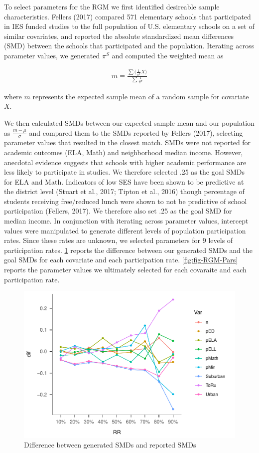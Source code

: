 \documentclass[man,floatsintext]{apa6}
\theoremstyle{definition}
\theoremstyle{definition}
\theoremstyle{definition}
\theoremstyle{remark}
\begin{document}
To select parameters for the RGM we first identified desireable sample
characteristics. Fellers (2017) compared 571 elementary schools that
participated in IES funded studies to the full population of U.S.
elementary schools on a set of similar covariates, and reported the
absolute standardized mean differences (SMD) between the schools that
participated and the population. Iterating across parameter values, we
generated \(\pi^S\) and computed the weighted mean as

\begin{align}
  m = \frac{\sum{(\frac{1}{\pi^S} X})}{\sum{\frac{1}{\pi^S}}}
\end{align}

where \(m\) represents the expected sample mean of a random sample for
covariate \(X\).

We then calculated SMDs between our expected sample mean and our
population as \(\frac{m - \mu}{\sigma}\) and compared them to the SMDs
reported by Fellers (2017), selecting parameter values that resulted in
the closest match. SMDs were not reported for academic outcomes (ELA,
Math) and neighborhood median income. However, anecdotal evidence
suggests that schools with higher academic performance are less likely
to participate in studies. We therefore selected .25 as the goal SMDs
for ELA and Math. Indicators of low SES have been shown to be predictive
at the district level (Stuart et al., 2017; Tipton et al., 2016) though
percentage of students receiving free/reduced lunch were shown to not be
predictive of school participation (Fellers, 2017). We therefore also
set .25 as the goal SMD for median income. In conjunction with iterating
across parameter values, intercept values were manipulated to generate
different levels of population participation rates. Since these rates
are unknown, we selected parameters for 9 levels of participation rates.
\ref{fig:fig-SMD-goal} reports the difference between our generated SMDs
and the goal SMDs for each covariate and each participation rate.
\ref{fig:fig-RGM-Pars} reports the parameter values we ultimately
selected for each covaraite and each participation rate.

\begin{figure}
\centering
\includegraphics{GenSamp_Paper_files/figure-latex/fig-SMD-goal-1.pdf}
\caption{\label{fig:fig-SMD-goal}Difference between generated SMDs and
reported SMDs}
\end{figure}
\end{document}
